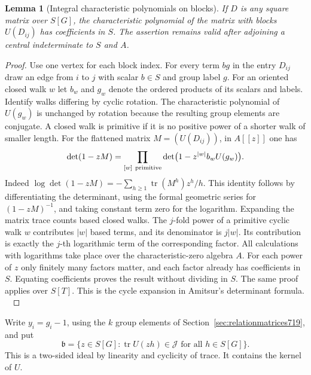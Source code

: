 \documentclass[a4paper,11pt]{article}
\newtheorem{lemma}[proposition]{Lemma}
\theoremstyle{definition}
\theoremstyle{remark}
\numberwithin{equation}{section}
\begin{document}
\begin{lemma}[Integral characteristic polynomials on blocks]
\leavevmode\label{lem:blockamitsur720}
If \(D\) is any square matrix over \(S[G]\), the characteristic
polynomial of the matrix with blocks \(U(D_{ij})\) has coefficients
in \(S\). The assertion remains valid after adjoining a central
indeterminate to \(S\) and \(A\).
\end{lemma}
\begin{proof}
Use one vertex for each block index. For every term \(b g\) in
the entry \(D_{ij}\) draw an edge from \(i\) to \(j\) with
scalar \(b\in S\) and group label \(g\). For an oriented closed
walk \(w\) let \(b_w\) and \(g_w\) denote the ordered products
of its scalars and labels. Identify walks differing by cyclic
rotation. The characteristic polynomial of \(U(g_w)\) is
unchanged by rotation because the resulting group elements
are conjugate. A closed walk is primitive if it is no
positive power of a shorter walk of smaller length.
For the flattened matrix \(M=(U(D_{ij}))\), in \(A[[z]]\) one has
\[
 \det(1-zM)=
   \prod_{[w]\ {\rm primitive}}
       \det\bigl(1-z^{|w|}b_w U(g_w)\bigr).
\]
Indeed \(\log\det(1-zM)=-\sum_{h\ge1}\operatorname{tr}(M^h)z^h/h\).
This identity follows by differentiating the determinant, using
the formal geometric series for \((1-zM)^{-1}\), and taking
constant term zero for the logarithm. Expanding the matrix
trace counts based closed walks. The \(j\)-fold power of a
primitive cyclic walk \(w\) contributes \(|w|\) based terms,
and its denominator is \(j|w|\). Its contribution is exactly
the \(j\)-th logarithmic term of the corresponding factor.
All calculations with logarithms take place over the
characteristic-zero algebra \(A\). For each power of \(z\)
only finitely many factors matter, and each factor already has
coefficients in \(S\). Equating coefficients proves the result
without dividing in \(S\). The same proof applies over \(S[T]\).
This is the cycle expansion in Amitsur's determinant formula.
~\cite{IX-VII-VII-amitsur720}
\end{proof}

Write \(y_i=g_i-1\), using the \(k\) group elements of
Section~\ref{sec:relationmatrices719}, and put
\[
        \mathfrak b=\{z\in S[G]:
            \operatorname{tr}U(zh)\in\mathcal J
                    \text{ for all }h\in S[G]\}.
\]
This is a two-sided ideal by linearity and cyclicity of trace.
It contains the kernel of \(U\).
\end{document}
